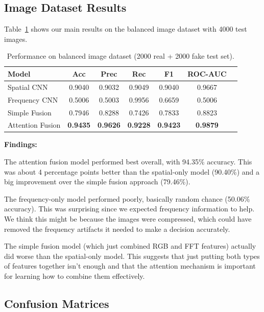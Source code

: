 \documentclass{article}
\begin{document}
\subsection{Image Dataset Results}

Table~\ref{tab:image} shows our main results on the balanced image dataset with 4000 test images.

\begin{table}[H]
\centering
\caption{Performance on balanced image dataset (2000 real + 2000 fake test set).}
\label{tab:image}
\begin{tabular}{lcccccc}
\toprule
\textbf{Model} & \textbf{Acc} & \textbf{Prec} & \textbf{Rec} & \textbf{F1} & \textbf{ROC-AUC} \\
\midrule
Spatial CNN          & 0.9040 & 0.9032 & 0.9049 & 0.9040 & 0.9667 \\
Frequency CNN        & 0.5006 & 0.5003 & 0.9956 & 0.6659 & 0.5006 \\
Simple Fusion        & 0.7946 & 0.8288 & 0.7426 & 0.7833 & 0.8823 \\
Attention Fusion     & \textbf{0.9435} & \textbf{0.9626} & \textbf{0.9228} & \textbf{0.9423} & \textbf{0.9879} \\
\bottomrule
\end{tabular}
\end{table}

\textbf{Findings:}

The attention fusion model performed best overall, with 94.35\% accuracy. This was about 4 percentage points better than the spatial-only model (90.40\%) and a big improvement over the simple fusion approach (79.46\%).

The frequency-only model performed poorly, basically random chance (50.06\% accuracy). This was surprising since we expected frequency information to help. We think this might be because the images were compressed, which could have removed the frequency artifacts it needed to make a decision accurately.

The simple fusion model (which just combined RGB and FFT features) actually did worse than the spatial-only model. This suggests that just putting both types of features together isn't enough and that the attention mechanism is important for learning how to combine them effectively.

\subsection{Confusion Matrices}
\end{document}
